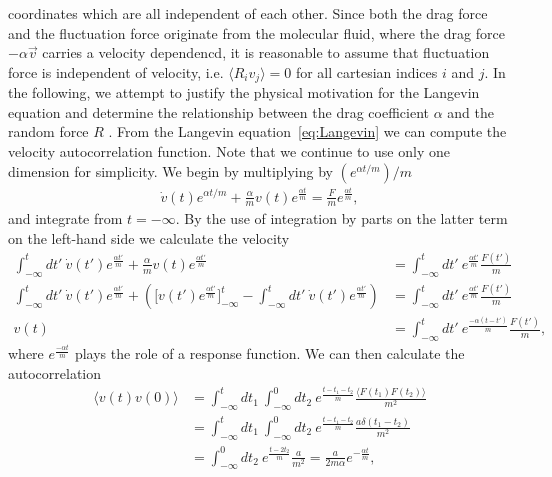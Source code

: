 coordinates which are all independent of each other. Since both the drag
force and the fluctuation force originate from the molecular fluid, where the
drag force $-\alpha \vec{v}$ carries a velocity dependencd, it is reasonable to assume that fluctuation force is independent of velocity, i.e. $\langle R_i v_j \rangle = 0$ for all cartesian indices $i$ and $j$.
In the following, we attempt to justify the physical motivation for the Langevin equation and determine the relationship between the drag coefficient $\alpha$ and the random force $R$ \cite{stat_phys}. From the Langevin equation~\cref{eq:Langevin} we can compute the velocity autocorrelation function. Note that we continue to use only one dimension for simplicity. We begin by multiplying by $(e^{\alpha t /m})/m$
\begin{align*}
  \dot{ v}(t)e^{\alpha t /m} + \frac{\alpha}{m} v(t)e^{\frac{\alpha t}{m}}  = \frac{ F}{m}e^{\frac{\alpha t}{m}},
\end{align*}
and integrate from $t = -\infty$. By the use of integration by parts on the
latter term on the left-hand side we calculate the velocity 
\begin{align*}
  \int_{-\infty}^t dt' \ \dot{ v}(t')e^{\frac{\alpha t'}{m}} + \frac{\alpha}{m} v(t)e^{\frac{\alpha t'}{m}} &=  \int_{-\infty}^t dt' \ e^{\frac{\alpha t'}{m}} \frac{ F(t')}{m}  \\
  \int_{-\infty}^t dt' \ \dot{ v}(t')e^{\frac{\alpha t'}{m}} + \left(\Big[ v(t')e^{\frac{\alpha t'}{m}}\Big]_{-\infty}^t - \int_{-\infty}^t dt' \ \dot{ v}(t')e^{\frac{\alpha t'}{m}}\right) &= \int_{-\infty}^t dt' \ e^{\frac{\alpha t'}{m}} \frac{ F(t')}{m}  \\
   v(t) &= \int_{-\infty}^t dt' \ e^{\frac{-\alpha(t - t')}{m}} \frac{ F(t')}{m},
\end{align*}
where $e^{\frac{-\alpha t}{m}}$ plays the role of a response function. We can
then calculate the autocorrelation 
\begin{align*}
  \big\langle  v(t) v(0) \big\rangle &= \int_{-\infty}^t dt_1 \ \int_{-\infty}^0 dt_2 \ e^{\frac{t - t_1 - t_2}{m}} \frac{\langle  F(t_1)  F(t_2) \rangle}{m^2} \\
  &= \int_{-\infty}^t dt_1 \ \int_{-\infty}^0 dt_2 \ e^{\frac{t - t_1 - t_2}{m}} \frac{a \delta(t_1 - t_2)}{m^2} \\
  &= \int_{-\infty}^0 dt_2 \ e^{\frac{t - 2t_2}{m}} \frac{a}{m^2} = \frac{a}{2m\alpha}e^{-\frac{\alpha t}{m}},
\end{align*}
